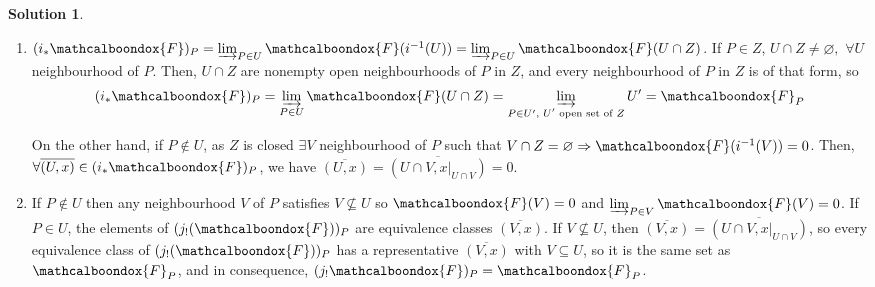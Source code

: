 \documentclass[12pt]{article}
\newcommand{\imp}{\ensuremath{\Rightarrow}}
\theoremstyle{definition}
\newtheorem*{sol}{Solution}
\newcommand{\sF}{\ensuremath{\mathcalboondox{F}}}
\begin{document}
\begin{sol}
	\begin{enumerate}[label=\alph*)]
		\item $(i_{*}\sF)_P = \varinjlim_{P \in U} \sF(i^{-1}(U)) = \varinjlim_{P \in U} \sF(U \cap Z)$. If $P \in Z$, $U \cap Z \neq \varnothing, \, \, \forall U$ neighbourhood of $P$. Then, $U \cap Z$ are nonempty open neighbourhoods of $P$ in $Z$, and every neighbourhood of $P$ in $Z$ is of that form, so 
		\[
			(i_{*}\sF)_P = \varinjlim_{P \in U} \sF(U \cap Z) = \varinjlim_{P \in U', \text{ $U'$ open set of $Z$}} U' = \sF_P
		\]

		On the other hand, if $P \notin U$, as $Z$ is closed $\exists V$ neighbourhood of $P$ such that $V \cap Z = \varnothing \imp \sF(i^{-1}(V)) = 0$. Then, $\forall \overline{(U,x)} \in (i_{*}\sF)_P$, we have $\overline{(U,x)} = \overline{(U \cap V, x|_{U\cap V})} = 0$.

		\item If $P \notin U$ then any neighbourhood $V$ of $P$ satisfies $V \not\subseteq U$ so $\sF(V) = 0$ and $\varinjlim_{P \in V} \sF(V) = 0$. If $P \in U$, the elements of $(j_{!}(\sF))_P$ are equivalence classes $\overline{(V,x)}$. If $V \not\subseteq U$, then $\overline{(V,x)} = \overline{(U \cap V, x|_{U\cap V})}$, so every equivalence class of $(j_{!}(\sF))_P$ has a representative $\overline{(V,x)}$ with $V \subseteq U$, so it is the same set as $\sF_P$, and in consequence, $(j_{!}\sF)_P = \sF_P$.


\end{enumerate}
\end{sol}
\end{document}
